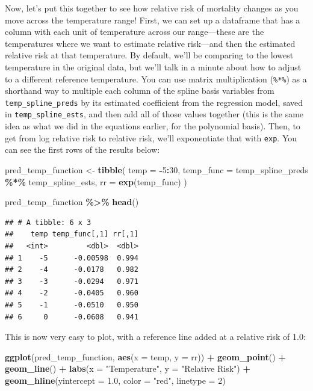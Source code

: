 \documentclass[
]{book}
\newenvironment{Shaded}{\begin{snugshade}}{\end{snugshade}}
\newcommand{\AttributeTok}[1]{\textcolor[rgb]{0.13,0.29,0.53}{#1}}
\newcommand{\DecValTok}[1]{\textcolor[rgb]{0.00,0.00,0.81}{#1}}
\newcommand{\FloatTok}[1]{\textcolor[rgb]{0.00,0.00,0.81}{#1}}
\newcommand{\FunctionTok}[1]{\textcolor[rgb]{0.13,0.29,0.53}{\textbf{#1}}}
\newcommand{\NormalTok}[1]{#1}
\newcommand{\OtherTok}[1]{\textcolor[rgb]{0.56,0.35,0.01}{#1}}
\newcommand{\SpecialCharTok}[1]{\textcolor[rgb]{0.81,0.36,0.00}{\textbf{#1}}}
\newcommand{\StringTok}[1]{\textcolor[rgb]{0.31,0.60,0.02}{#1}}
\begin{document}
Now, let's put this together to see how relative risk of mortality changes as you move
across the temperature range! First, we can set up a dataframe that has a column with
each unit of temperature across our range---these are the temperatures where we want to
estimate relative risk---and then the estimated relative risk at that temperature. By
default, we'll be comparing to the lowest temperature in the original data, but we'll talk
in a minute about how to adjust to a different reference temperature. You can use
matrix multiplication (\texttt{\%*\%}) as a shorthand way to multiple each column of the spline
basis variables from \texttt{temp\_spline\_preds} by its estimated coefficient from the regression
model, saved in \texttt{temp\_spline\_ests}, and then add all of those values together (this is
the same idea as what we did in the equations earlier, for the polynomial basis). Then,
to get from log relative risk to relative risk, we'll exponentiate that with \texttt{exp}. You
can see the first rows of the results below:

\begin{Shaded}
\begin{Highlighting}[]
\NormalTok{pred\_temp\_function }\OtherTok{\textless{}{-}} \FunctionTok{tibble}\NormalTok{(}
  \AttributeTok{temp =} \SpecialCharTok{{-}}\DecValTok{5}\SpecialCharTok{:}\DecValTok{30}\NormalTok{, }
  \AttributeTok{temp\_func =}\NormalTok{ temp\_spline\_preds }\SpecialCharTok{\%*\%}\NormalTok{ temp\_spline\_ests,}
  \AttributeTok{rr =} \FunctionTok{exp}\NormalTok{(temp\_func)}
\NormalTok{)}

\NormalTok{pred\_temp\_function }\SpecialCharTok{\%\textgreater{}\%} 
  \FunctionTok{head}\NormalTok{()}
\end{Highlighting}
\end{Shaded}

\begin{verbatim}
## # A tibble: 6 x 3
##    temp temp_func[,1] rr[,1]
##   <int>         <dbl>  <dbl>
## 1    -5      -0.00598  0.994
## 2    -4      -0.0178   0.982
## 3    -3      -0.0294   0.971
## 4    -2      -0.0405   0.960
## 5    -1      -0.0510   0.950
## 6     0      -0.0608   0.941
\end{verbatim}

This is now very easy to plot, with a reference line added at a relative risk of 1.0:

\begin{Shaded}
\begin{Highlighting}[]
\FunctionTok{ggplot}\NormalTok{(pred\_temp\_function, }\FunctionTok{aes}\NormalTok{(}\AttributeTok{x =}\NormalTok{ temp, }\AttributeTok{y =}\NormalTok{ rr)) }\SpecialCharTok{+} 
  \FunctionTok{geom\_point}\NormalTok{() }\SpecialCharTok{+} 
  \FunctionTok{geom\_line}\NormalTok{() }\SpecialCharTok{+} 
  \FunctionTok{labs}\NormalTok{(}\AttributeTok{x =} \StringTok{"Temperature"}\NormalTok{, }
       \AttributeTok{y =} \StringTok{"Relative Risk"}\NormalTok{) }\SpecialCharTok{+} 
  \FunctionTok{geom\_hline}\NormalTok{(}\AttributeTok{yintercept =} \FloatTok{1.0}\NormalTok{, }\AttributeTok{color =} \StringTok{"red"}\NormalTok{, }\AttributeTok{linetype =} \DecValTok{2}\NormalTok{)}
\end{Highlighting}
\end{Shaded}
\end{document}
